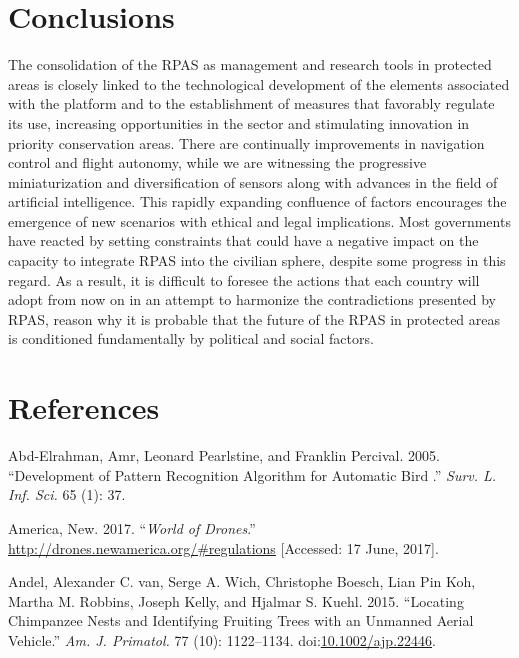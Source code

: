 \documentclass[]{interact}
\theoremstyle{plain}%
\theoremstyle{definition}
\theoremstyle{remark}
\begin{document}
\section{Conclusions}\label{conclusions}

The consolidation of the RPAS as management and research tools in
protected areas is closely linked to the technological development of
the elements associated with the platform and to the establishment of
measures that favorably regulate its use, increasing opportunities in
the sector and stimulating innovation in priority conservation areas.
There are continually improvements in navigation control and flight
autonomy, while we are witnessing the progressive miniaturization and
diversification of sensors along with advances in the field of
artificial intelligence. This rapidly expanding confluence of factors
encourages the emergence of new scenarios with ethical and legal
implications. Most governments have reacted by setting constraints that
could have a negative impact on the capacity to integrate RPAS into the
civilian sphere, despite some progress in this regard. As a result, it
is difficult to foresee the actions that each country will adopt from
now on in an attempt to harmonize the contradictions presented by RPAS,
reason why it is probable that the future of the RPAS in protected areas
is conditioned fundamentally by political and social factors.

\section*{References}\label{references}

\hypertarget{refs}{}
\hypertarget{ref-abd-elrahman_development_2005}{}
Abd-Elrahman, Amr, Leonard Pearlstine, and Franklin Percival. 2005.
``Development of Pattern Recognition Algorithm for Automatic Bird .''
\emph{Surv. L. Inf. Sci.} 65 (1): 37.

\hypertarget{ref-Bworld_of_drones2017}{}
America, New. 2017. ``\emph{World of Drones}.''
\url{http://drones.newamerica.org/\#regulations} {[}Accessed: 17 June,
2017{]}.

\hypertarget{ref-van_andel_locating_2015}{}
Andel, Alexander C. van, Serge A. Wich, Christophe Boesch, Lian Pin Koh,
Martha M. Robbins, Joseph Kelly, and Hjalmar S. Kuehl. 2015. ``Locating
Chimpanzee Nests and Identifying Fruiting Trees with an Unmanned Aerial
Vehicle.'' \emph{Am. J. Primatol.} 77 (10): 1122--1134.
doi:\href{https://doi.org/10.1002/ajp.22446}{10.1002/ajp.22446}.
\end{document}
